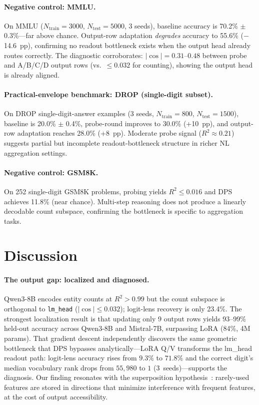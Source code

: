 \documentclass{article}
\begin{document}
\paragraph{Negative control: MMLU.}
On MMLU ($N_{\text{train}}{=}3000$, $N_{\text{test}}{=}5000$, 3 seeds),
baseline accuracy is 70.2\% $\pm$ 0.3\%---far above chance.
Output-row adaptation \emph{degrades} accuracy to 55.6\% ($-$14.6~pp),
confirming no readout bottleneck exists when the output head already routes correctly.
The diagnostic corroborates: $|\cos| = 0.31$--$0.48$ between probe and A/B/C/D output rows (vs.\ $\leq 0.032$ for counting), showing the output head is already aligned.

\paragraph{Practical-envelope benchmark: DROP (single-digit subset).}
On DROP single-digit-answer examples (3 seeds, $N_{\text{train}}{=}800$, $N_{\text{test}}{=}1500$),
baseline is 20.0\% $\pm$ 0.4\%, probe-round improves to 30.0\% (+10~pp), and
output-row adaptation reaches 28.0\% (+8~pp).
Moderate probe signal ($R^2 \approx 0.21$) suggests partial but incomplete
readout-bottleneck structure in richer NL aggregation settings.

\paragraph{Negative control: GSM8K.}
On 252 single-digit GSM8K problems, probing yields $R^2 \leq 0.016$ and DPS achieves 11.8\% (near chance).
Multi-step reasoning does not produce a linearly decodable count subspace, confirming the bottleneck is specific to aggregation tasks.

\section{Discussion}
\label{sec:discussion}

\paragraph{The output gap: localized and diagnosed.}
Qwen3-8B encodes entity counts at $R^2>0.99$ but the count subspace is orthogonal to \texttt{lm\_head} ($|\cos| \leq 0.032$); logit-lens recovery is only 23.4\%. The strongest localization result is that updating only 9 output rows yields 93--99\% held-out accuracy across Qwen3-8B and Mistral-7B, surpassing LoRA (84\%, 4M params). That gradient descent independently discovers the same geometric bottleneck that DPS bypasses analytically---LoRA Q/V transforms the lm\_head readout path: logit-lens accuracy rises from $9.3\%$ to $71.8\%$ and the correct digit's median vocabulary rank drops from $55{,}980$ to $1$ (3~seeds)---supports the diagnosis.
Our finding resonates with the superposition hypothesis~\citep{elhage2022superposition}: rarely-used features are stored in directions that minimize interference with frequent features, at the cost of output accessibility.
\end{document}
